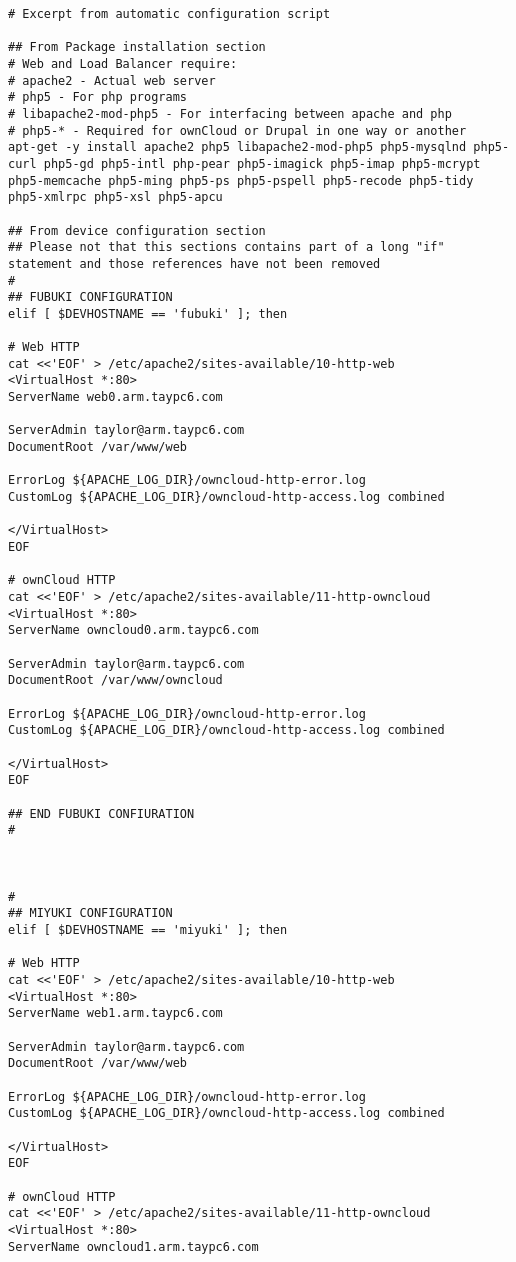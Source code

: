 \documentclass[12pt]{spieman}  %
\begin{document}
\begin{lstlisting}
# Excerpt from automatic configuration script

## From Package installation section
# Web and Load Balancer require:
# apache2 - Actual web server
# php5 - For php programs
# libapache2-mod-php5 - For interfacing between apache and php
# php5-* - Required for ownCloud or Drupal in one way or another
apt-get -y install apache2 php5 libapache2-mod-php5 php5-mysqlnd php5-curl php5-gd php5-intl php-pear php5-imagick php5-imap php5-mcrypt php5-memcache php5-ming php5-ps php5-pspell php5-recode php5-tidy php5-xmlrpc php5-xsl php5-apcu

## From device configuration section
## Please not that this sections contains part of a long "if" statement and those references have not been removed
#
## FUBUKI CONFIGURATION
elif [ $DEVHOSTNAME == 'fubuki' ]; then

# Web HTTP
cat <<'EOF' > /etc/apache2/sites-available/10-http-web
<VirtualHost *:80>
ServerName web0.arm.taypc6.com

ServerAdmin taylor@arm.taypc6.com
DocumentRoot /var/www/web

ErrorLog ${APACHE_LOG_DIR}/owncloud-http-error.log
CustomLog ${APACHE_LOG_DIR}/owncloud-http-access.log combined

</VirtualHost>
EOF

# ownCloud HTTP
cat <<'EOF' > /etc/apache2/sites-available/11-http-owncloud
<VirtualHost *:80>
ServerName owncloud0.arm.taypc6.com

ServerAdmin taylor@arm.taypc6.com
DocumentRoot /var/www/owncloud

ErrorLog ${APACHE_LOG_DIR}/owncloud-http-error.log
CustomLog ${APACHE_LOG_DIR}/owncloud-http-access.log combined

</VirtualHost>
EOF

## END FUBUKI CONFIURATION
#



#
## MIYUKI CONFIGURATION
elif [ $DEVHOSTNAME == 'miyuki' ]; then

# Web HTTP
cat <<'EOF' > /etc/apache2/sites-available/10-http-web
<VirtualHost *:80>
ServerName web1.arm.taypc6.com

ServerAdmin taylor@arm.taypc6.com
DocumentRoot /var/www/web

ErrorLog ${APACHE_LOG_DIR}/owncloud-http-error.log
CustomLog ${APACHE_LOG_DIR}/owncloud-http-access.log combined

</VirtualHost>
EOF

# ownCloud HTTP
cat <<'EOF' > /etc/apache2/sites-available/11-http-owncloud
<VirtualHost *:80>
ServerName owncloud1.arm.taypc6.com


\end{lstlisting}
\end{document}

